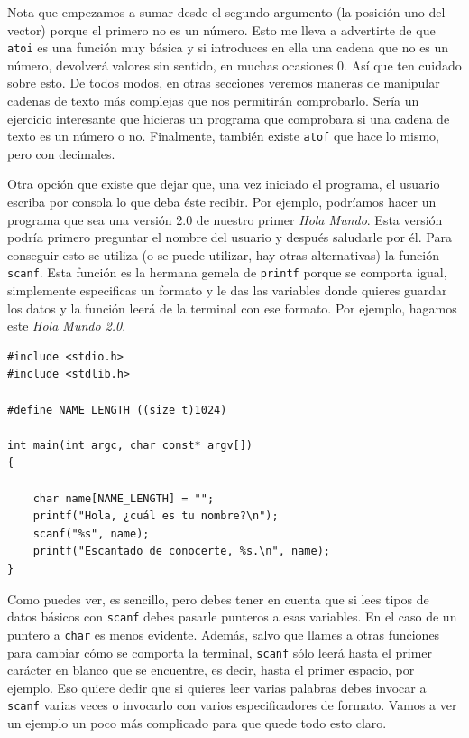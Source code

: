 \documentclass[a4paper]{article}
\begin{document}
Nota que empezamos a sumar desde el segundo argumento (la posición uno del
vector) porque el primero no es un número. Esto me lleva a advertirte de que
\verb!atoi! es una función muy básica y si introduces en ella una cadena que no
es un número, devolverá valores sin sentido, en muchas ocasiones 0. Así
que ten cuidado sobre esto. De todos modos, en otras secciones veremos maneras
de manipular cadenas de texto más complejas que nos permitirán comprobarlo.
Sería un ejercicio interesante que hicieras un programa que comprobara si una
cadena de texto es un número o no. Finalmente, también existe \verb!atof! que
hace lo mismo, pero con decimales.

Otra opción que existe que dejar que, una vez iniciado el programa, el usuario
escriba por consola lo que deba éste recibir. Por ejemplo, podríamos hacer un
programa que sea una versión 2.0 de nuestro primer \emph{Hola Mundo}. Esta
versión podría primero preguntar el nombre del usuario y después saludarle por
él. Para conseguir esto se utiliza (o se puede utilizar, hay otras alternativas)
la función \verb!scanf!. Esta función es la hermana gemela de \verb!printf!
porque se comporta igual, simplemente especificas un formato y le das las
variables donde quieres guardar los datos y la función leerá de la terminal
con ese formato. Por ejemplo, hagamos este \emph{Hola Mundo 2.0}.

\noindent
\begin{minipage}[H]{\linewidth}
\mbox{}
\begin{lstlisting}[style=C,
caption={Ejemplo básico de \texttt{scanf}},
label={lst:basicScanf}]
#include <stdio.h>
#include <stdlib.h>

#define NAME_LENGTH ((size_t)1024)

int main(int argc, char const* argv[])
{

    char name[NAME_LENGTH] = "";
    printf("Hola, ¿cuál es tu nombre?\n");
    scanf("%s", name);
    printf("Escantado de conocerte, %s.\n", name);
}
\end{lstlisting}
\end{minipage}

Como puedes ver, es sencillo, pero debes tener en cuenta que si lees tipos
de datos básicos con \verb!scanf! debes pasarle punteros a esas variables. En
el caso de un puntero a \verb!char! es menos evidente. Además, salvo que llames
a otras funciones para cambiar cómo se comporta la terminal, \verb!scanf! sólo
leerá hasta el primer carácter en blanco que se encuentre, es decir, hasta el
primer espacio, por ejemplo. Eso quiere dedir que si quieres leer varias
palabras debes invocar a \verb!scanf! varias veces o invocarlo con varios
especificadores de formato. Vamos a ver un ejemplo un poco más complicado para
que quede todo esto claro.
\end{document}
